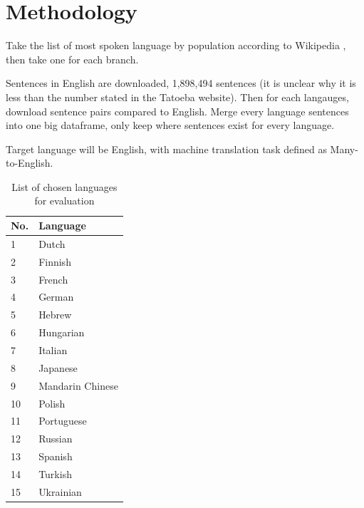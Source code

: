 \documentclass[a4paper]{article}
\begin{document}
\section{Methodology}

Take the list of most spoken language by population according to Wikipedia \cite{wikipedia-list-languages}, then take one for each branch.

Sentences in English are downloaded, 1,898,494 sentences (it is unclear why it is less than the number stated in the Tatoeba website). Then for each langauges, download sentence pairs compared to English. Merge every language sentences into one big dataframe, only keep where sentences exist for every language.

Target language will be English, with machine translation task defined as Many-to-English.

\begin{table}[htbp]
    \centering
    \begin{tabular}{|l|l|}
        \hline
        \textbf{No.} & \textbf{Language} \\
        \hline
        1            & Dutch             \\
        2            & Finnish           \\
        3            & French            \\
        4            & German            \\
        5            & Hebrew            \\
        6            & Hungarian         \\
        7            & Italian           \\
        8            & Japanese          \\
        9            & Mandarin Chinese  \\
        10           & Polish            \\
        11           & Portuguese        \\
        12           & Russian           \\
        13           & Spanish           \\
        14           & Turkish           \\
        15           & Ukrainian         \\
        \hline
    \end{tabular}
    \caption{List of chosen languages for evaluation}
\end{table}
\end{document}
